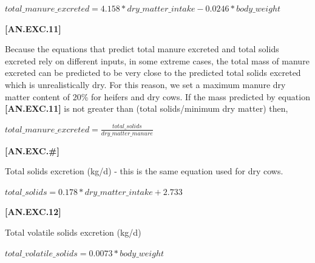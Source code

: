 \begin{refsection}
\begin{itemize}
    \begin{center}
        \(total\_manure\_excreted=4.158 * dry\_matter\_intake-0.0246 * body\_weight\)
    \end{center}
        \vspace{0.5cm} 
    
            {\raggedleft \textbf{[AN.EXC.11]}\par}
            \vspace{0.5cm} 


Because the equations that predict total manure excreted and total solids excreted rely on different inputs, in some extreme cases, the total mass of manure excreted can be predicted to be very close to the predicted total solids excreted which is unrealistically dry. For this reason, we set a maximum manure dry matter content of 20\% for heifers and dry cows. If the mass predicted by equation \textbf{[AN.EXC.11]} is not greater than (total solids/minimum dry matter) then, 
        \vspace{0.5cm}
    
    \begin{center}
        \(total\_manure\_excreted= \frac{total\_solids}{dry\_matter\_manure}\)
    \end{center}
        \vspace{0.5cm} 
    
            {\raggedleft \textbf{[AN.EXC.\#]}\par}
            \vspace{0.5cm} 

Total solids excretion (kg/d) - this is the same equation used for dry cows.
        \vspace{0.5cm}
    
    \begin{center}
        \(total\_solids=0.178 * dry\_matter\_intake+2.733\)
    \end{center}
        \vspace{0.5cm} 
    
            {\raggedleft \textbf{[AN.EXC.12]}\par}
            \vspace{0.5cm} 

Total volatile solids excretion (kg/d)
        \vspace{0.5cm}
    
    \begin{center}
        \(total\_volatile\_solids=0.0073 * body\_weight\)
    \end{center}
        \vspace{0.5cm} 
    

\end{itemize}
\end{refsection}
